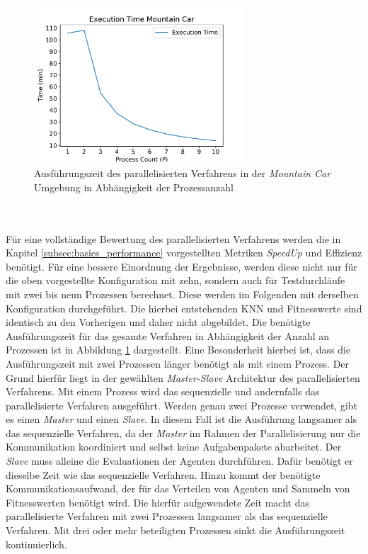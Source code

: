 \begin{figure}[!h]
	\centering
	\includegraphics[width=0.7\textwidth]{./img/mountain_car_analysis/time_mountain_car_1_10.pdf} 
	\caption{Ausführungszeit des parallelisierten Verfahrens in der \emph{Mountain Car} Umgebung in Abhängigkeit der Prozessanzahl}
	\label{fig:execution_time_mountain_car_1_10}
\end{figure}
\\\\
Für eine vollständige Bewertung des parallelisierten Verfahrens werden die in Kapitel \ref{subsec:basics_performance} vorgestellten Metriken \emph{SpeedUp} und Effizienz benötigt. Für eine bessere Einordnung der Ergebnisse, werden diese nicht nur für die oben vorgestellte Konfiguration mit zehn, sondern auch für Testdurchläufe mit zwei bis neun Prozessen berechnet. Diese werden im Folgenden mit derselben Konfiguration durchgeführt. Die hierbei entstehenden \ac{KNN} und Fitnesswerte sind identisch zu den Vorherigen und daher nicht abgebildet. Die benötigte Ausführungszeit für das gesamte Verfahren in Abhängigkeit der Anzahl an Prozessen ist in Abbildung \ref{fig:execution_time_mountain_car_1_10} dargestellt. Eine Besonderheit hierbei ist, dass die Ausführungszeit mit zwei Prozessen länger benötigt als mit einem Prozess. Der Grund hierfür liegt in der gewählten \emph{Master-Slave} Architektur des parallelisierten Verfahrens. Mit einem Prozess wird das sequenzielle und andernfalls das parallelisierte Verfahren ausgeführt. Werden genau zwei Prozesse verwendet, gibt es einen \emph{Master} und einen \emph{Slave}. In diesem Fall ist die Ausführung langsamer als das sequenzielle Verfahren, da der \emph{Master} im Rahmen der Parallelisierung nur die Kommunikation koordiniert und selbst keine Aufgabenpakete abarbeitet. Der \emph{Slave} muss alleine die Evaluationen der Agenten durchführen. Dafür benötigt er dieselbe Zeit wie das sequenzielle Verfahren. Hinzu kommt der benötigte Kommunikationsaufwand, der für das Verteilen von Agenten und Sammeln von Fitnesswerten benötigt wird. Die hierfür aufgewendete Zeit macht das parallelisierte Verfahren mit zwei Prozessen langsamer als das sequenzielle Verfahren. Mit drei oder mehr beteiligten Prozessen sinkt die Ausführungszeit kontinuierlich. 

